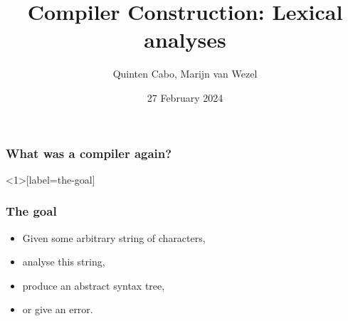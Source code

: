 \documentclass{beamer}
\title{\textbf{Compiler Construction: Lexical analyses}}
\author{Quinten Cabo, Marijn van Wezel}
\institute{Radboud University Nijmegen}
\date{27 February 2024}
\begin{document}

\frame{\titlepage}

\begin{frame}
  \frametitle{What was a compiler again?}
  
  \begin{center}
  \end{center}
\end{frame}

\begin{frame}<1>[label=the-goal]
  \frametitle{The goal}

  \begin{itemize}
    \item \alert<1>{Given some arbitrary string of characters,} \pause
    \item \pause \alert<3>{analyse this string,} \pause
    \item \pause \alert<5>{produce an abstract syntax tree,} \pause
    \item \pause \alert<7>{or give an error.}
  \end{itemize}
\end{frame}
\end{document}
